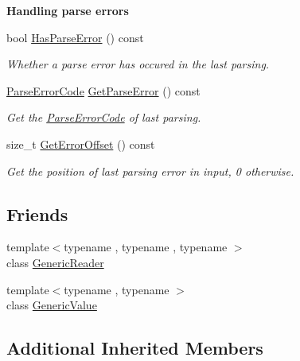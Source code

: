 \begin{Indent}{\bf Handling parse errors}\par
\begin{DoxyCompactItemize}
\item 
bool \hyperlink{classGenericDocument_afe0c87d9fc13a78597360e0646479419}{Has\+Parse\+Error} () const 
\begin{DoxyCompactList}\small\item\em Whether a parse error has occured in the last parsing. \end{DoxyCompactList}\item 
\hyperlink{group__RAPIDJSON__ERRORS_ga8d4b32dfc45840bca189ade2bbcb6ba7}{Parse\+Error\+Code} \hyperlink{classGenericDocument_aab4771355aa3c6e5368da3ae36f38cc1}{Get\+Parse\+Error} () const 
\begin{DoxyCompactList}\small\item\em Get the \hyperlink{group__RAPIDJSON__ERRORS_ga8d4b32dfc45840bca189ade2bbcb6ba7}{Parse\+Error\+Code} of last parsing. \end{DoxyCompactList}\item 
size\+\_\+t \hyperlink{classGenericDocument_a2db6ad11d157342f725470fb898b6712}{Get\+Error\+Offset} () const 
\begin{DoxyCompactList}\small\item\em Get the position of last parsing error in input, 0 otherwise. \end{DoxyCompactList}\end{DoxyCompactItemize}
\end{Indent}
\subsection*{Friends}
\begin{DoxyCompactItemize}
\item 
{\footnotesize template$<$typename , typename , typename $>$ }\\class \hyperlink{classGenericDocument_a22b985b0f7f78ef254a566655ee0550f}{Generic\+Reader}
\item 
{\footnotesize template$<$typename , typename $>$ }\\class \hyperlink{classGenericDocument_a899449e1a645b5e377af059fb61113d8}{Generic\+Value}
\end{DoxyCompactItemize}
\subsection*{Additional Inherited Members}


